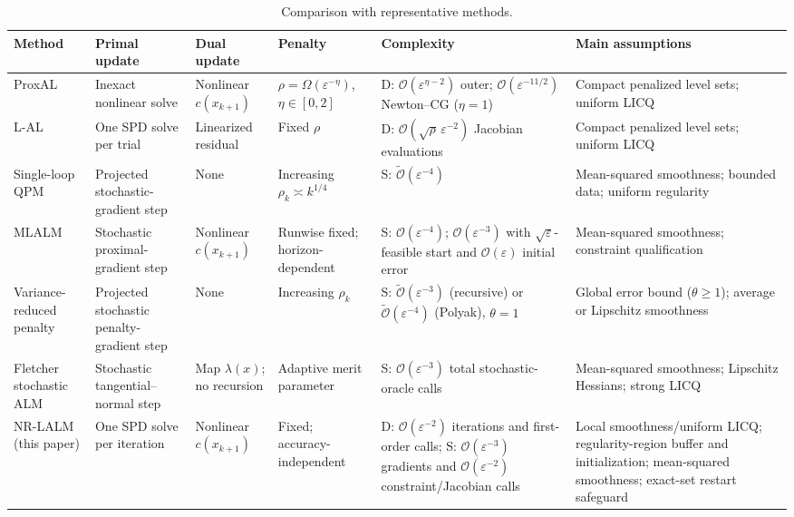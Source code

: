 \documentclass[11pt]{article}
\theoremstyle{definition}
\theoremstyle{remark}
\numberwithin{equation}{section}
\numberwithin{figure}{section}
\numberwithin{table}{section}
\numberwithin{algorithm}{section}
\newcommand{\cO}{\mathcal{O}}
\newcommand{\eps}{\varepsilon}
\begin{document}
\begin{table}[H]
\caption{Comparison with representative methods.}
\label{tab:intro-comparison}
\centering
\fontsize{6.8pt}{7.0pt}\selectfont
\setlength{\tabcolsep}{1.1pt}
\renewcommand{\arraystretch}{0.72}
\begin{tabular}{@{}>{\raggedright\arraybackslash}p{}
>{\raggedright\arraybackslash}p{}
>{\centering\arraybackslash}p{}
>{\raggedright\arraybackslash}p{}
>{\raggedright\arraybackslash}p{}
>{\raggedright\arraybackslash}p{}@{}}
\toprule
Method & Primal update & Dual update & Penalty & Complexity & Main assumptions \\
\midrule
ProxAL~\cite{XieWright2021}
& Inexact nonlinear solve
& Nonlinear $c(x_{k+1})$
& $\rho=\Omega(\eps^{-\eta})$, $\eta\in[0,2]$
& D: $\cO(\eps^{\eta-2})$ outer;
  $\cO(\eps^{-11/2})$ Newton--CG ($\eta=1$)
& Compact penalized level sets; uniform LICQ
\\ \hline
L-AL~\cite{BourkhissiNecoara2025}
& One SPD solve per trial
& Linearized residual
& Fixed $\rho$
& D: $\cO(\sqrt{\rho}\,\eps^{-2})$ Jacobian evaluations
& Compact penalized level sets; uniform LICQ
\\ \hline
Single-loop QPM~\cite{AlacaogluWright2024}
& Projected stochastic-gradient step
& None
& Increasing $\rho_k\asymp k^{1/4}$
& S: $\widetilde{\cO}(\eps^{-4})$
& Mean-squared smoothness; bounded data; uniform regularity
\\ \hline
MLALM~\cite{ShiWangWang2025}
& Stochastic proximal-gradient step
& Nonlinear $c(x_{k+1})$
& Runwise fixed; horizon-dependent
& S: $\cO(\eps^{-4})$; $\cO(\eps^{-3})$ with
  $\sqrt\eps$-feasible start and $\cO(\eps)$ initial error
& Mean-squared smoothness; constraint qualification
\\ \hline
Variance-reduced penalty~\cite{LuMeiXiao2026}
& Projected stochastic penalty-gradient step
& None
& Increasing $\rho_k$
& S: $\widetilde{\cO}(\eps^{-3})$ (recursive) or
  $\widetilde{\cO}(\eps^{-4})$ (Polyak), $\theta=1$
& Global error bound ($\theta\ge1$); average or Lipschitz smoothness
\\ \hline
Fletcher stochastic ALM~\cite{CuiEtAl2026}
& Stochastic tangential--normal step
& Map $\lambda(x)$; no recursion
& Adaptive merit parameter
& S: $\cO(\eps^{-3})$ total stochastic-oracle calls
& Mean-squared smoothness; Lipschitz Hessians; strong LICQ
\\ \hline
NR-LALM (this paper)
& One SPD solve per iteration
& Nonlinear $c(x_{k+1})$
& Fixed; accuracy-independent
& D: $\cO(\eps^{-2})$ iterations and first-order calls;
  S: $\cO(\eps^{-3})$ gradients and
  $\cO(\eps^{-2})$ constraint/Jacobian calls
& Local smoothness/uniform LICQ; regularity-region buffer and initialization;
  mean-squared smoothness; exact-set restart safeguard
\\
\bottomrule
\end{tabular}
\end{table}
\end{document}
